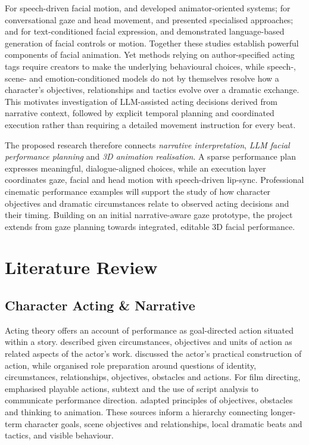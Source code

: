 \documentclass[11pt,a4paper]{article}
\begin{document}
For speech-driven facial motion, \citet{edwards2016jali} and \citet{zhou2018visemenet} developed animator-oriented systems; for conversational gaze and head movement, \citet{pan2024s3} and \citet{zhuang2026talkingeyes} presented specialised approaches; and for text-conditioned facial expression, \citet{durupinar2025prompt} and \citet{song2026tdmm} demonstrated language-based generation of facial controls or motion. Together these studies establish powerful components of facial animation. Yet methods relying on author-specified acting tags require creators to make the underlying behavioural choices, while speech-, scene- and emotion-conditioned models do not by themselves resolve how a character's objectives, relationships and tactics evolve over a dramatic exchange. This motivates investigation of LLM-assisted acting decisions derived from narrative context, followed by explicit temporal planning and coordinated execution rather than requiring a detailed movement instruction for every beat.

The proposed research therefore connects \emph{narrative interpretation}, \emph{LLM facial performance planning} and \emph{3D animation realisation}. A sparse performance plan expresses meaningful, dialogue-aligned choices, while an execution layer coordinates gaze, facial and head motion with speech-driven lip-sync. Professional cinematic performance examples will support the study of how character objectives and dramatic circumstances relate to observed acting decisions and their timing. Building on an initial narrative-aware gaze prototype, the project extends from gaze planning towards integrated, editable 3D facial performance.

\section{Literature Review}

\subsection{Character Acting \& Narrative}

Acting theory offers an account of performance as goal-directed action situated within a story. \citet{stanislavski1936actor} described given circumstances, objectives and units of action as related aspects of the actor's work. \citet{hagen1973respect} discussed the actor's practical construction of action, while \citet{hagen1991challenge} organised role preparation around questions of identity, circumstances, relationships, objectives, obstacles and actions. For film directing, \citet{weston1996directing} emphasised playable actions, subtext and the use of script analysis to communicate performance direction. \citet{hooks2023acting} adapted principles of objectives, obstacles and thinking to animation. These sources inform a hierarchy connecting longer-term character goals, scene objectives and relationships, local dramatic beats and tactics, and visible behaviour.
\end{document}
